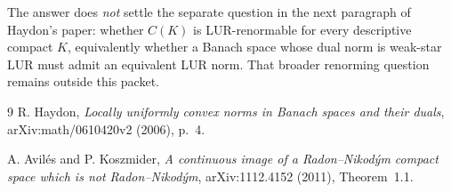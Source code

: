 \documentclass[11pt]{article}
\begin{document}
The answer does \emph{not} settle the separate question in the next paragraph of Haydon's paper: whether $C(K)$ is LUR-renormable for every descriptive compact $K$, equivalently whether a Banach space whose dual norm is weak-star LUR must admit an equivalent LUR norm.  That broader renorming question remains outside this packet.

{\raggedright
\begin{thebibliography}{9}
R. Haydon,
\emph{Locally uniformly convex norms in Banach spaces and their duals},
arXiv:math/0610420v2 (2006), p.~4.

A. Avil\'es and P. Koszmider,
\emph{A continuous image of a Radon--Nikod\'ym compact space which is not Radon--Nikod\'ym},
arXiv:1112.4152 (2011), Theorem~1.1.
\end{thebibliography}
\par}
\end{document}
